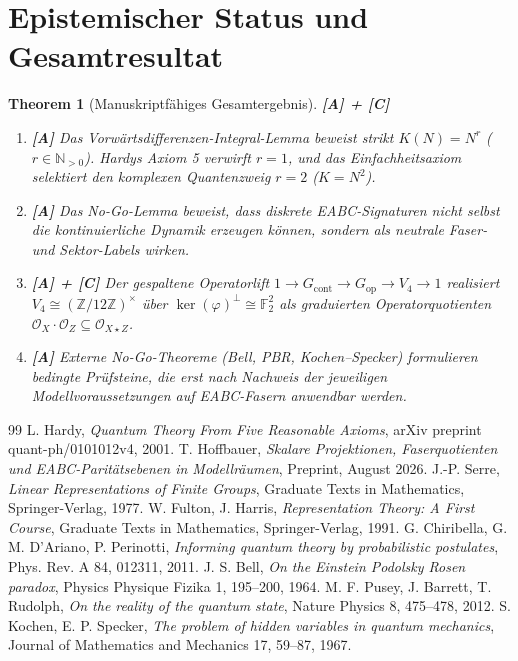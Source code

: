 \documentclass[11pt,a4paper,reqno]{amsart}
\newtheorem{theorem}{Theorem}[section]
\theoremstyle{definition}
\theoremstyle{remark}
\begin{document}
	\section{Epistemischer Status und Gesamtresultat}
	
	\begin{theorem}[Manuskriptf\"ahiges Gesamtergebnis] \textbf{[A] + [C]}
		\begin{enumerate}
			\item \textbf{[A]} Das Vorw\"artsdifferenzen-Integral-Lemma beweist strikt $K(N) = N^r$ ($r \in \mathbb{N}_{>0}$). Hardys Axiom 5 verwirft $r=1$, und das Einfachheitsaxiom selektiert den komplexen Quantenzweig $r=2$ ($K=N^2$).
			\item \textbf{[A]} Das No-Go-Lemma beweist, dass diskrete EABC-Signaturen nicht selbst die kontinuierliche Dynamik erzeugen k\"onnen, sondern als neutrale Faser- und Sektor-Labels wirken.
			\item \textbf{[A] + [C]} Der gespaltene Operatorlift $1 \to G_{\mathrm{cont}} \to G_{\mathrm{op}} \to V_4 \to 1$ realisiert $V_4 \cong (\mathbb{Z}/12\mathbb{Z})^\times$ \"uber $\operatorname{ker}(\varphi)^\perp \cong \mathbb{F}_2^2$ als graduierten Operatorquotienten $\mathcal{O}_X \cdot \mathcal{O}_Z \subseteq \mathcal{O}_{X \star Z}$.
			\item \textbf{[A]} Externe No-Go-Theoreme (Bell, PBR, Kochen--Specker) formulieren bedingte Prüfsteine, die erst nach Nachweis der jeweiligen Modellvoraussetzungen auf EABC-Fasern anwendbar werden.
		\end{enumerate}
	\end{theorem}
	
	\begin{thebibliography}{99}
		 L. Hardy, \emph{Quantum Theory From Five Reasonable Axioms}, arXiv preprint quant-ph/0101012v4, 2001.
		 T. Hoffbauer, \emph{Skalare Projektionen, Faserquotienten und EABC-Parit\"atsebenen in Modellr\"aumen}, Preprint, August 2026.
		 J.-P. Serre, \emph{Linear Representations of Finite Groups}, Graduate Texts in Mathematics, Springer-Verlag, 1977.
		 W. Fulton, J. Harris, \emph{Representation Theory: A First Course}, Graduate Texts in Mathematics, Springer-Verlag, 1991.
		 G. Chiribella, G. M. D’Ariano, P. Perinotti, \emph{Informing quantum theory by probabilistic postulates}, Phys. Rev. A 84, 012311, 2011.
		 J. S. Bell, \emph{On the Einstein Podolsky Rosen paradox}, Physics Physique Fizika 1, 195--200, 1964.
		 M. F. Pusey, J. Barrett, T. Rudolph, \emph{On the reality of the quantum state}, Nature Physics 8, 475--478, 2012.
		 S. Kochen, E. P. Specker, \emph{The problem of hidden variables in quantum mechanics}, Journal of Mathematics and Mechanics 17, 59--87, 1967.
	\end{thebibliography}
	
\end{document}
